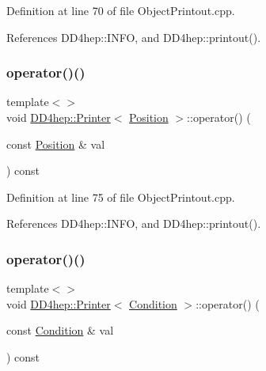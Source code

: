 Definition at line 70 of file Object\+Printout.\+cpp.



References D\+D4hep\+::\+I\+N\+FO, and D\+D4hep\+::printout().

\hypertarget{struct_d_d4hep_1_1_printer_afe6264c0121d56d3a2a581883a377c9c}{}\label{struct_d_d4hep_1_1_printer_afe6264c0121d56d3a2a581883a377c9c} 
\subsubsection{\texorpdfstring{operator()()}{operator()()}\hspace{0.1cm}{\footnotesize\ttfamily [9/12]}}
{\footnotesize\ttfamily template$<$$>$ \\
void \hyperlink{struct_d_d4hep_1_1_printer}{D\+D4hep\+::\+Printer}$<$ \hyperlink{namespace_d_d4hep_1_1_geometry_a55083902099d03506c6db01b80404900}{Position} $>$\+::operator() (\begin{DoxyParamCaption}\item[{const \hyperlink{namespace_d_d4hep_1_1_geometry_a55083902099d03506c6db01b80404900}{Position} \&}]{val }\end{DoxyParamCaption}) const}



Definition at line 75 of file Object\+Printout.\+cpp.



References D\+D4hep\+::\+I\+N\+FO, and D\+D4hep\+::printout().

\hypertarget{struct_d_d4hep_1_1_printer_a353b9c794a611d154e26875467f3c260}{}\label{struct_d_d4hep_1_1_printer_a353b9c794a611d154e26875467f3c260} 
\subsubsection{\texorpdfstring{operator()()}{operator()()}\hspace{0.1cm}{\footnotesize\ttfamily [10/12]}}
{\footnotesize\ttfamily template$<$$>$ \\
void \hyperlink{struct_d_d4hep_1_1_printer}{D\+D4hep\+::\+Printer}$<$ \hyperlink{class_d_d4hep_1_1_conditions_1_1_condition}{Condition} $>$\+::operator() (\begin{DoxyParamCaption}\item[{const \hyperlink{class_d_d4hep_1_1_conditions_1_1_condition}{Condition} \&}]{val }\end{DoxyParamCaption}) const}



